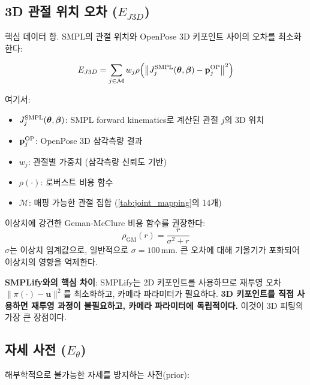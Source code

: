 \documentclass[11pt, a4paper]{report}
\begin{document}
\subsection{3D 관절 위치 오차 ($E_{J3D}$)}

핵심 데이터 항. SMPL의 관절 위치와 OpenPose 3D 키포인트 사이의 오차를 최소화한다:

\begin{equation}
E_{J3D} = \sum_{j \in \mathcal{M}} w_j \rho\!\left(
  \left\| J_j^{\text{SMPL}}(\bm{\theta}, \bm{\beta}) - \mathbf{p}_j^{\text{OP}} \right\|^2
\right)
\end{equation}

여기서:
\begin{itemize}[nosep]
  \item $J_j^{\text{SMPL}}(\bm{\theta}, \bm{\beta})$: SMPL forward kinematics로 계산된 관절 $j$의 3D 위치
  \item $\mathbf{p}_j^{\text{OP}}$: OpenPose 3D 삼각측량 결과
  \item $w_j$: 관절별 가중치 (삼각측량 신뢰도 기반)
  \item $\rho(\cdot)$: 로버스트 비용 함수
  \item $\mathcal{M}$: 매핑 가능한 관절 집합 (\cref{tab:joint_mapping}의 14개)
\end{itemize}

\begin{cvbox}[title={로버스트 비용 함수}]
이상치에 강건한 Geman-McClure 비용 함수를 권장한다:
\begin{equation}
\rho_{\text{GM}}(r) = \frac{r}{\sigma^2 + r}
\end{equation}
$\sigma$는 이상치 임계값으로, 일반적으로 $\sigma = 100$\,mm.
큰 오차에 대해 기울기가 포화되어 이상치의 영향을 억제한다.
\end{cvbox}

\begin{keyidea}
\textbf{SMPLify와의 핵심 차이}:
SMPLify는 2D 키포인트를 사용하므로 재투영 오차 $\|\pi(\cdot) - \mathbf{u}\|^2$를 최소화하고,
카메라 파라미터가 필요하다.
\textbf{3D 키포인트를 직접 사용하면 재투영 과정이 불필요하고, 카메라 파라미터에 독립적이다.}
이것이 3D 피팅의 가장 큰 장점이다.
\end{keyidea}


\subsection{자세 사전 ($E_\theta$)}

해부학적으로 불가능한 자세를 방지하는 사전(prior):
\end{document}
